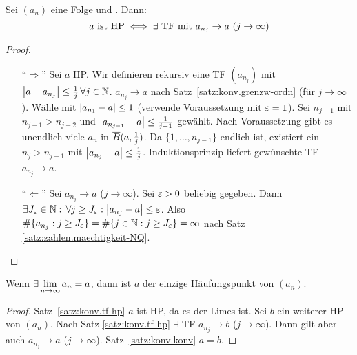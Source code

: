 \documentclass[12pt]{scrreprt}
\begin{document}
\begin{satz}
  \label{satz:konv.tf-hp}
  Sei $(a_n)$ eine Folge und . Dann:
  \[a \text{ ist HP} \iff \exists \text{ TF mit } a_{n_j} \to a \
  (j\to\infty)\]
\end{satz}
\begin{proof}
  \begin{enumerate}
  \item["`$\Rightarrow$"'] Sei $a$ HP. Wir definieren rekursiv eine TF
    $(a_{n_j})$ mit
    $\left\lvert a-a_{n_j}\right\lvert\le\frac1j\,\forall j\in\mathbb{N}$. \folgt $a_{n_j}\to a$
    nach Satz~\ref{satz:konv.grenzw-ordn} (für $j\to\infty$). Wähle
    \nat{n_1} mit $\left\lvert a_{n_1}-a\right\lvert\le1$ (verwende Voraussetzung mit
    $\varepsilon=1$). Sei $n_{j-1}$ mit $n_{j-1}>n_{j-2}$ und
    $\left\lvert a_{n_{j-1}}-a\right\lvert\le\frac{1}{j-1}$ gewählt. Nach Voraussetzung
    gibt es unendlich viele $a_n$ in $\overline{B}(a,\frac1j)$. Da
    $\{1,\dotsc,n_{j-1}\}$ endlich ist, existiert ein $n_j>n_{j-1}$
    mit $\left\lvert a_{n_j}-a\right\lvert\le\frac1j$. Induktionsprinzip liefert
    gewünschte TF $a_{n_j}\to a$.
  \item["`$\Leftarrow$"'] Sei $a_{n_j}\to a$ ($j\to\infty$). Sei
    $\varepsilon>0$ beliebig gegeben. Dann $\exists J_\varepsilon\in\mathbb{N}:\,\forall j\ge
    J_\varepsilon:\left\lvert a_{n_j}-a\right\lvert\le\varepsilon$. Also $\#\{a_{n_j}:j\ge J_\varepsilon\} =
    \#\{j\in\mathbb{N}:j\ge J_\varepsilon\}=\infty$ nach Satz
    \ref{satz:zahlen.maechtigkeit-NQ}.
  \end{enumerate}
\end{proof}

\begin{kor}
  \label{kor:konv.lim-hp}
  Wenn $\exists\lim\limits_{n\rightarrow\infty}{a_n}=a$, dann ist $a$ der einzige
  Häufungspunkt von $(a_n)$.
\end{kor}
\begin{proof}
  Satz~\ref{satz:konv.tf-hp} \folgt $a$ ist HP, da es der Limes
  ist. Sei $b$ ein weiterer HP von $(a_n)$. Nach Satz
  \ref{satz:konv.tf-hp} $\exists$ TF $a_{n_j}\to b$
  ($j\to\infty$). Dann gilt aber auch $a_{n_j}\to a$
  ($j\to\infty$). Satz~\ref{satz:konv.konv} \folgt $a=b$.
\end{proof}
\end{document}
